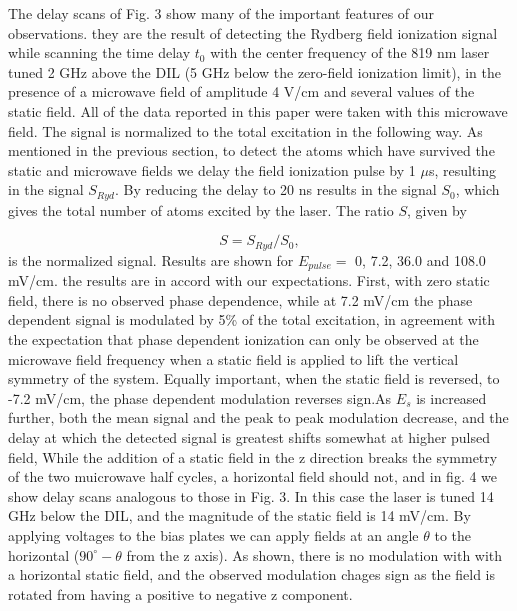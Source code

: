 \documentclass[aps,pra,preprint,groupedaddress]{revtex4-1}
\begin{document}
The delay scans of Fig. 3 show many of the important features of our observations. they are the result of detecting the Rydberg field ionization signal while scanning the time delay $t_0$ with the center frequency of the 819 nm laser tuned 2 GHz above the DIL (5 GHz below the zero-field ionization limit), in the presence of a microwave field of amplitude 4 V/cm and several values of the static field. All of the data reported in this paper were taken with this microwave field. The signal is normalized to the total excitation in the following way. As mentioned in the previous section, to detect the atoms which have survived the static and microwave fields we delay the field ionization pulse by 1 $\mu$s, resulting in the signal $S_{Ryd}$. By reducing the delay to 20 ns results in the signal $S_0$, which gives the total number of atoms excited by the laser. The ratio $S$, given by

\begin{equation} \label{eq:norm}
S=S_{Ryd}/S_0,
\end{equation}
is the normalized signal. Results are shown for $E_{pulse} =$ 0, 7.2, 36.0 and 108.0 mV/cm. the results are in accord with our expectations. First, with zero static field, there is no observed phase dependence, while at 7.2 mV/cm the phase dependent signal is modulated by 5\% of the total excitation, in agreement with the expectation that phase dependent ionization can only be observed at the microwave field frequency when a static field is applied to lift the vertical symmetry of the system. Equally important, when the static field is reversed, to -7.2 mV/cm, the phase dependent modulation reverses sign.As $E_s$ is increased further, both the mean signal and the peak to peak modulation decrease, and the delay at which the detected signal is greatest shifts somewhat at higher pulsed field,
While the addition of a static field in the z direction breaks the symmetry of the two muicrowave half cycles, a horizontal field should not, and in fig. 4 we show delay scans analogous to those in Fig. 3. In this case the laser is tuned 14 GHz below the DIL, and the magnitude of the static field is 14 mV/cm. By applying voltages to the bias plates we can apply fields at an angle $\theta$ to the horizontal ($90^{\circ}-\theta$ from the z axis). As shown, there is no modulation with with a horizontal static field, and the observed modulation chages sign as the field is rotated from having a positive to negative z component.
\end{document}
